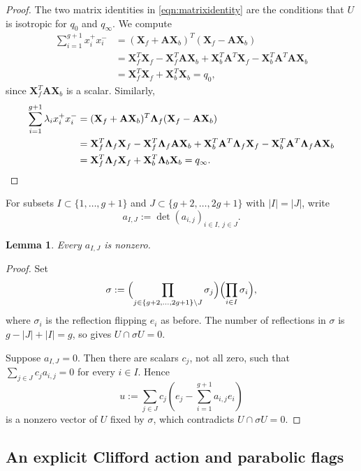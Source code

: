 \documentclass[12pt, letterpaper]{amsart}
\newtheorem{lemma}[theorem]{Lemma}
\theoremstyle{definition}
\newcommand{\bA}{\mathbf{A} }
\newcommand{\bX}{\mathbf{X} }
\newcommand{\lbd}{\lambda}
\begin{document}
\begin{proof}
The two matrix identities in \eqref{eqn:matrixidentity} are the conditions that \(U\) is isotropic for \(q_0\) and \(q_\infty\). We compute
\begin{align*}
\sum_{i=1}^{g+1}x_i^+x_i^- &=(\bX_f+\bA\bX_b)^T(\bX_f-\bA\bX_b)\\
&=\bX_f^T\bX_f-\bX_f^T\bA\bX_b +\bX_b^T\bA^T\bX_f-\bX_b^T\bA^T\bA\bX_b\\
&=\bX_f^T\bX_f+\bX_b^T\bX_b=q_0,
\end{align*}
since \(\bX_f^T\bA\bX_b\) is a scalar. Similarly,
\begin{align*}
\sum_{i=1}^{g+1}\lbd_i x_i^+x_i^- &=(\bX_f+\bA\bX_b)^T\mathbf\Lambda_f(\bX_f-\bA\bX_b)\\
&=\bX_f^T\mathbf\Lambda_f\bX_f -\bX_f^T\mathbf\Lambda_f\bA\bX_b +\bX_b^T\bA^T\mathbf\Lambda_f\bX_f -\bX_b^T\bA^T\mathbf\Lambda_f\bA\bX_b\\
&=\bX_f^T\mathbf\Lambda_f\bX_f+\bX_b^T\mathbf\Lambda_b\bX_b =q_\infty.\qedhere
\end{align*}
\end{proof}

For subsets \(I\subset\{1,\dots,g+1\}\) and \(J\subset\{g+2,\dots,2g+1\}\) with \(|I|=|J|\), write
\[a_{I,J}:=\det(a_{i,j})_{i\in I,\ j\in J}.\]

\begin{lemma}\label{lem:A_minors}
Every \(a_{I,J}\) is nonzero.
\end{lemma}

\begin{proof}
Set
\[\sigma:= \Bigl(\prod_{j\in \{g+2,\dots,2g+1\}\setminus J}\sigma_j\Bigr) \Bigl(\prod_{i\in I}\sigma_i\Bigr),\]
where \(\sigma_i\) is the reflection flipping \(e_i\) as before. The number of reflections in \(\sigma\) is \(g-|J|+|I|=g\), so \cite[Theorem~3.8]{Rei73} gives \(U\cap\sigma U=0\).

Suppose \(a_{I,J}=0\). Then there are scalars \(c_j\), not all zero, such that \(\sum_{j\in J}c_j a_{i,j}=0\) for every \(i\in I\). Hence
\[u:=\sum_{j\in J}c_j\left(e_j-\sum_{i=1}^{g+1}a_{i,j}e_i\right)\]
is a nonzero vector of \(U\) fixed by \(\sigma\), which contradicts \(U\cap\sigma U=0\).
\end{proof}

\subsection{An explicit Clifford action and parabolic flags}\label{ssec:explicit_flags}
\end{document}
